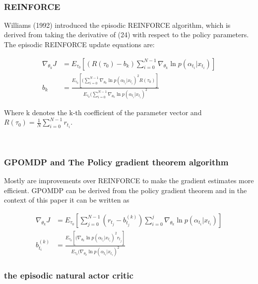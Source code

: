 \documentclass[journal]{IEEEtran}
\begin{document}
\ \\
\subsubsection{REINFORCE}
Williams (1992) introduced the episodic REINFORCE algorithm, which is derived from taking the derivative of (24) with respect to the policy parameters.
The episodic REINFORCE update equations are:

\begin{equation}
  \begin{aligned}
    \nabla_{\theta_k} J &= E_{\tau_0}[(R(\tau_0) - b_k)\sum_{i = 0}^{N-1}\nabla_{\theta_k} \ln p(\alpha_{t_i}|x_{t_i})] \\
    b_k & = \frac{E_{\tau_0}[( \sum_{i = 0}^{N-1}\nabla_{\theta_k} \ln p(\alpha_{t_i}|x_{t_i})^2R(\tau_0) ]}{E_{\tau_0}( \sum_{i = 0}^{N-1}\nabla_{\theta_k} \ln p(\alpha_{t_i}|x_{t_i})^2} \nonumber 
  \end{aligned}
\end{equation}

Where k denotes the k-th coefficient of the parameter vector and $R(\tau_0) = \frac{1}{N} \sum_{i = 0}^{N-1}r_{t_i}$.

\ \\
\subsubsection{GPOMDP and The Policy gradient theorem algorithm}

Mostly are improvements over REINFORCE to make the gradient estimates more efficient. GPOMDP can be derived from the policy gradient theorem and in the context of this paper it can be written as 

\begin{equation}
  \begin{aligned}
    \nabla_{\theta_k} J &= E_{\tau_0}[\sum_{j = 0}^{N-1}(r_{t_j} - b_{t_j}^{(k)})\sum_{i = 0}^{j}\nabla_{\theta_k} \ln p(\alpha_{t_i}|x_{t_i})] \\
    b_{t_i}^{(k)} & = \frac{E_{\tau_0}[( \nabla_{\theta_k} \ln p(\alpha_{t_i}|x_{t_i})^2r_{t_j}]}{E_{\tau_0}(\nabla_{\theta_k} \ln p(\alpha_{t_i}|x_{t_i})^2} \nonumber 
  \end{aligned}
\end{equation}


\subsubsection{the episodic natural actor critic}
\end{document}
